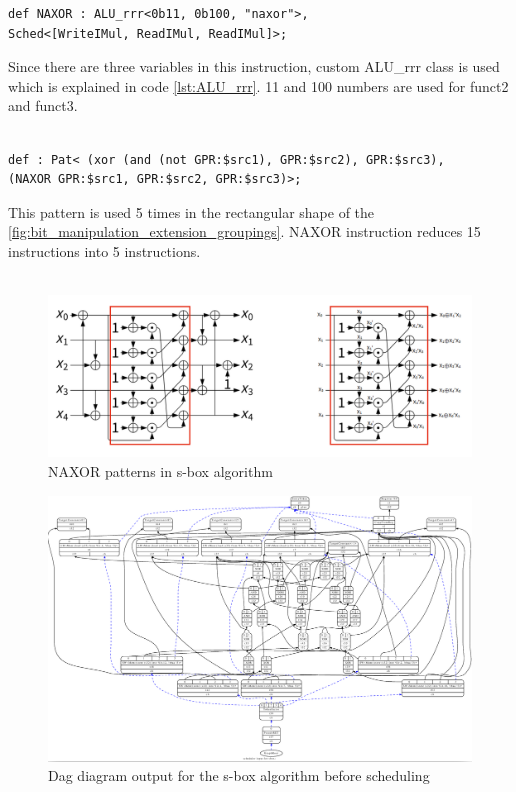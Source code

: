 \begin{lstlisting}
def NAXOR : ALU_rrr<0b11, 0b100, "naxor">,
Sched<[WriteIMul, ReadIMul, ReadIMul]>;
\end{lstlisting}

Since there are three variables in this instruction, custom ALU\_rrr class is used which is explained in code \ref{lst:ALU_rrr}. 11 and 100 numbers are used for funct2 and funct3.
\\\\
\begin{lstlisting}
def : Pat< (xor (and (not GPR:$src1), GPR:$src2), GPR:$src3),
(NAXOR GPR:$src1, GPR:$src2, GPR:$src3)>;
\end{lstlisting}

This pattern is used 5 times in the rectangular shape of the \ref{fig:bit_manipulation_extension_groupings}. NAXOR instruction reduces 15 instructions into 5 instructions.
\\\\
\begin{figure}
    \centering
    \includegraphics[scale=0.3]{adding_new_instr/sbox_naxor_pattern.png}
    \caption{NAXOR patterns in s-box algorithm}
    \label{fig:sbox_naxor_pattern}
\end{figure}

\begin{figure}
    \centering
    \includegraphics[scale=0.2]{adding_new_instr/naxor_sched.png}
    \caption{Dag diagram output for the s-box algorithm before scheduling}
    \label{fig:naxor_sched_diagram}
\end{figure}

